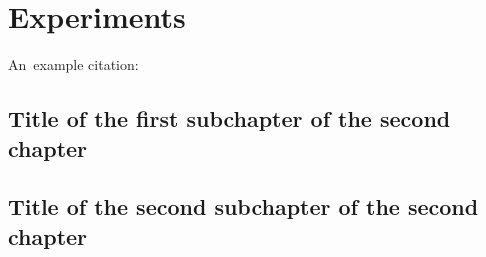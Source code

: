 \chapter{Experiments}

An~example citation: \cite{Andel07}

\section{Title of the first subchapter of the second chapter}

\section{Title of the second subchapter of the second chapter}
